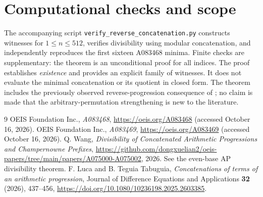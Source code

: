\documentclass[11pt]{article}
\begin{document}
\section{Computational checks and scope}
The accompanying script \texttt{verify\_reverse\_concatenation.py}
constructs witnesses for $1\le n\le512$, verifies divisibility using
modular concatenation, and independently reproduces the first sixteen
A083468 minima. Finite checks are supplementary: the theorem is an
unconditional proof for all indices.
The proof establishes \emph{existence} and provides an explicit family of
witnesses. It does not evaluate the minimal concatenation or its
quotient in closed form. The theorem includes the previously observed
reverse-progression consequence of \cite{wangAP}; no claim is made
that the arbitrary-permutation strengthening is new to the literature.
\begin{thebibliography}{9}
 OEIS Foundation Inc.,
  \emph{A083468}, \url{https://oeis.org/A083468}
  (accessed October 16, 2026).
 OEIS Foundation Inc.,
  \emph{A083469}, \url{https://oeis.org/A083469}
  (accessed October 16, 2026).
 Q. Wang,
  \emph{Divisibility of Concatenated Arithmetic Progressions and
  Champernowne Prefixes},
  \url{https://github.com/dongxuelian2/oeis-papers/tree/main/papers/A075000-A075002},
  2026. See the even-base AP divisibility theorem.
 F. Luca and B. Teguia Tabuguia,
 \emph{Concatenations of terms of an arithmetic progression},
 Journal of Difference Equations and Applications \textbf{32} (2026), 437--456,
 \url{https://doi.org/10.1080/10236198.2025.2603385}.
\end{thebibliography}
\end{document}
